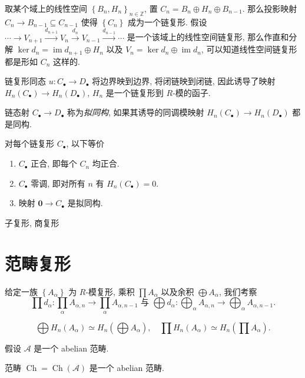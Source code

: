 \begin{example}
  取某个域上的线性空间 \( \left\lbrace B_n, H_n \right\rbrace_{n \in \mathbb{Z}}
  \), 置 \( C_n = B_n \oplus H_n \oplus B_{n - 1} \). 那么投影映射 \( C_n \to
  B_{n - 1} \subseteq C_{n - 1} \) 使得 \( \left\lbrace C_n \right\rbrace \)
  成为一个链复形. 假设 \( \cdots \to V_{n + 1} \xrightarrow{d_{n + 1}} V_n
  \xrightarrow{d_n} V_{n - 1} \xrightarrow{d_{n - 1}} \cdots
  \) 是一个该域上的线性空间链复形, 那么作直和分解 \( \operatorname{ker} d_n =
  \operatorname{im} d_{n + 1} \oplus H_n \) 以及 \( V_n = \operatorname{ker} d_n
  \oplus \operatorname{im}d_n \), 可以知道线性空间链复形都是形如 \( C_n \)
  这样的.
\end{example}

\begin{proposition}
  链复形同态 \( u: C_{\bullet} \to D_{\bullet} \) 将边界映到边界, 将闭链映到闭链,
  因此诱导了映射 \( H_n(C_{\bullet}) \to H_n(D_\bullet) \), \( H_n \) 是一个链复形到
  \( R \)-模的函子.
\end{proposition}

链态射 \( C_{\bullet} \to D_{\bullet} \) 称为\emph{拟同构}, 如果其诱导的同调模映射
\( H_n(C_{\bullet}) \to H_n(D_{\bullet}) \) 都是同构.

\begin{proposition}
  对每个链复形 \( C_{\bullet} \), 以下等价
  \begin{enumerate}
    \item \( C_{\bullet} \) 正合, 即每个 \( C_n \) 均正合.
    \item \( C_{\bullet} \) 零调, 即对所有 \( n \) 有 \( H_n(C_{\bullet}) = 0
      \).
    \item 映射 \( \mathbf{0} \to C_{\bullet} \) 是拟同构.
  \end{enumerate}
\end{proposition}

子复形, 商复形

\section{范畴复形}
给定一族 \( \left\lbrace A_{\alpha}
\right\rbrace \) 为 \( R \)-模复形, 乘积 \( \prod A_{\alpha} \) 以及余积 \(
\bigoplus A_{\alpha} \), 我们考察
\[
  \prod d_{\alpha}: \prod_{\alpha} A_{\alpha, n} \to \prod_{\alpha} A_{\alpha, n
  - 1} \text{ 与 } \bigoplus d_{\alpha}: \bigoplus_{\alpha} A_{\alpha, n} \to
  \bigoplus_{\alpha} A_{\alpha, n - 1}.
\]

\begin{lemma}
  \[
    \bigoplus H_n (A_{\alpha}) \simeq H_n \left(\bigoplus A_{\alpha}\right),\quad
    \prod H_n \left(A_{\alpha}\right) \simeq H_n \left(\prod A_{\alpha}\right).
  \]
\end{lemma}

假设 \( \mathcal{A} \) 是一个 abelian 范畴.
\begin{theorem}
  范畴 \( \operatorname{Ch} = \operatorname{Ch}(\mathcal{A}) \) 是一个 abelian 范畴.
\end{theorem}
